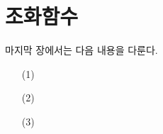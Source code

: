 
\chapter{조화함수}

마지막 장에서는 다음 내용을 다룬다.

\begin{itemize}
\item[(1)] 
\item[(2)] 
\item[(3)] 
\end{itemize}

